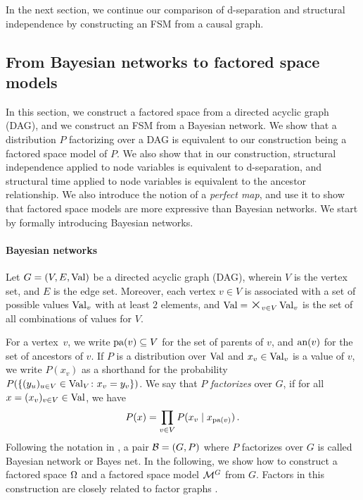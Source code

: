 \documentclass[USenglish,onecolumn]{article}
\begin{document}
In the next section, we continue our comparison of d-separation and structural independence by constructing an FSM from a causal graph.
\subsection{From Bayesian networks to factored space models}
\label{sec:dagconstruction}

In this section, we construct a factored space from a directed acyclic graph (DAG), and we construct an FSM from a Bayesian network. We show that a distribution $P$ factorizing over a DAG is equivalent to our construction being a factored space model of $P$.
We also show that in our construction, structural independence applied to node variables is equivalent to d-separation, and structural time applied to node variables is equivalent to the ancestor relationship. We also introduce the notion of a \emph{perfect map}, and use it to show that factored space models are more expressive than Bayesian networks. We start by formally introducing Bayesian networks.

\paragraph*{Bayesian networks}
Let $G=(V,E,\textnormal{Val})$ be a directed acyclic graph (DAG), wherein $V$ is the vertex set, and $E$ is the edge set. Moreover, each vertex $v\in V$ is associated with a set of possible values $\textnormal{Val}_v$ with at least $2$ elements, and $\Val=\timesbig_\vinV \Val_v$ is the set of all combinations of values for $V$.

For a vertex~$v$, we write ${\text{pa}(v)}\subseteq V$ for the set of parents of $v$, and $\text{an}(v)$ for the set of ancestors of $v$.
If $P$ is a distribution over $\textnormal{Val}$ and $x_v\in \textnormal{Val}_v$ is a value of $v$, we write $P(x_v)$ as a shorthand for the probability $P(\{(y_u)_{u\in V}  \in \textnormal{Val}_V \colon x_v=y_v\})$.
We say that $P$
\emph{factorizes} over $G$, if for all $x=(x_v)_{v\in V} \in \textnormal{Val}$, we have
\begin{align}\label{eq:Bayes-factorizes}%
P(x)=\prod_\vinV P(x_v\given \xpav)\,.
\end{align}
Following the notation in \cite{koller2009probabilistic}, a pair $\mathcal{B}=(G, P)$ where $P$ factorizes over $G$ is called Bayesian network or Bayes net.
%
In the following, we show how to construct a factored space $\Omega$ and a factored space model $\mathcal{M}^G$ from $G$.
Factors in this construction are closely related to factor graphs \cite{witten2002data}.
\end{document}
